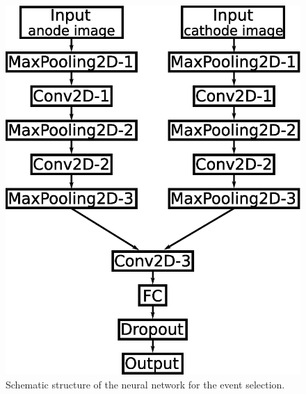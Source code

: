 \documentclass{jps-cp}
\begin{document}
\vspace{0zw}
\begin{figure}
  \centering
  \begin{minipage}{0.4\columnwidth}
    \centering
    \includegraphics[clip, width=0.9\columnwidth]{eps/event_selection_v2.eps}
    \caption{Schematic structure of the neural network for the event selection.}
    \label{fig:selection}
  \end{minipage}
  \hfill
  \begin{minipage}{0.4\columnwidth}
    \centering

\end{minipage}
\end{figure}
\end{document}
